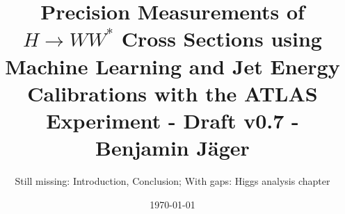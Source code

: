 

\endofdump


% 

\newif\ifIMAGES
\IMAGEStrue





\author{Still missing: Introduction, Conclusion; With gaps: Higgs analysis chapter}
\date{\today}
\title{Precision Measurements of $H \to WW^*$ Cross Sections using Machine Learning and Jet Energy Calibrations with the ATLAS Experiment - Draft v0.7 - Benjamin Jäger}




\maketitle





\tableofcontents


\newcommand{\chapterdir}{chapters}
%

%



